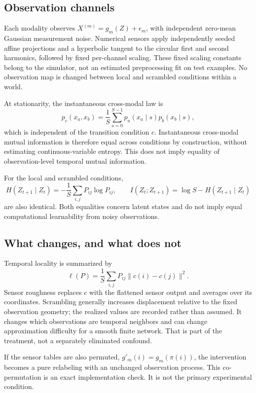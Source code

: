 \documentclass[11pt,a4paper]{article}
\begin{document}
\subsection{Observation channels}
Each modality observes $X^{(m)}=g_m(Z)+\epsilon_m$, with independent zero-mean Gaussian measurement noise. Numerical sensors apply independently seeded affine projections and a hyperbolic tangent to the circular first and second harmonics, followed by fixed per-channel scaling. These fixed scaling constants belong to the simulator, not an estimated preprocessing fit on test examples. No observation map is changed between local and scrambled conditions within a world.

At stationarity, the instantaneous cross-modal law is
\begin{equation}
p_c(x_a,x_b)=\frac1S\sum_{s=0}^{S-1}p_a(x_a\mid s)p_b(x_b\mid s),
\label{eq:matched}
\end{equation}
which is independent of the transition condition $c$. Instantaneous cross-modal mutual information is therefore equal across conditions by construction, without estimating continuous-variable entropy. This does not imply equality of observation-level temporal mutual information.

For the local and scrambled conditions,
\begin{equation}
H(Z_{t+1}\mid Z_t)=-\frac1S\sum_{i,j}P_{ij}\log P_{ij},\qquad
I(Z_t;Z_{t+1})=\log S-H(Z_{t+1}\mid Z_t)
\end{equation}
are also identical. Both equalities concern latent states and do not imply equal computational learnability from noisy observations.

\subsection{What changes, and what does not}
Temporal locality is summarized by
\begin{equation}
\ell(P)=\frac1S\sum_{i,j}P_{ij}\|c(i)-c(j)\|^2.
\end{equation}
Sensor roughness replaces $c$ with the flattened sensor output and averages over its coordinates. Scrambling generally increases displacement relative to the fixed observation geometry; the realized values are recorded rather than assumed. It changes which observations are temporal neighbors and can change approximation difficulty for a smooth finite network. That is part of the treatment, not a separately eliminated confound.

If the sensor tables are also permuted, $g'_m(i)=g_m(\pi(i))$, the intervention becomes a pure relabeling with an unchanged observation process. This co-permutation is an exact implementation check. It is not the primary experimental condition.
\end{document}
